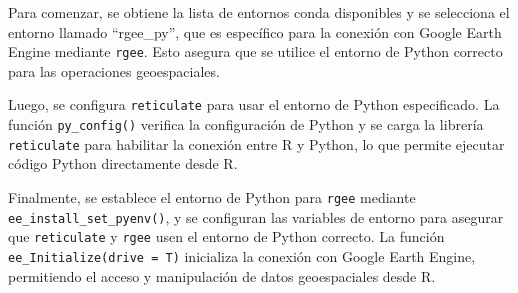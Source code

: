 \documentclass[
  12pt,
]{book}
\newenvironment{Shaded}{\begin{snugshade}}{\end{snugshade}}
\newcommand{\AttributeTok}[1]{\textcolor[rgb]{0.13,0.29,0.53}{#1}}
\newcommand{\CommentTok}[1]{\textcolor[rgb]{0.56,0.35,0.01}{\textit{#1}}}
\newcommand{\DecValTok}[1]{\textcolor[rgb]{0.00,0.00,0.81}{#1}}
\newcommand{\FunctionTok}[1]{\textcolor[rgb]{0.13,0.29,0.53}{\textbf{#1}}}
\newcommand{\NormalTok}[1]{#1}
\newcommand{\OtherTok}[1]{\textcolor[rgb]{0.56,0.35,0.01}{#1}}
\newcommand{\SpecialCharTok}[1]{\textcolor[rgb]{0.81,0.36,0.00}{\textbf{#1}}}
\newcommand{\StringTok}[1]{\textcolor[rgb]{0.31,0.60,0.02}{#1}}
\begin{document}
Para comenzar, se obtiene la lista de entornos conda disponibles y se selecciona el entorno llamado ``rgee\_py'', que es específico para la conexión con Google Earth Engine mediante \texttt{rgee}. Esto asegura que se utilice el entorno de Python correcto para las operaciones geoespaciales.

Luego, se configura \texttt{reticulate} para usar el entorno de Python especificado. La función \texttt{py\_config()} verifica la configuración de Python y se carga la librería \texttt{reticulate} para habilitar la conexión entre R y Python, lo que permite ejecutar código Python directamente desde R.

Finalmente, se establece el entorno de Python para \texttt{rgee} mediante \texttt{ee\_install\_set\_pyenv()}, y se configuran las variables de entorno para asegurar que \texttt{reticulate} y \texttt{rgee} usen el entorno de Python correcto. La función \texttt{ee\_Initialize(drive\ =\ T)} inicializa la conexión con Google Earth Engine, permitiendo el acceso y manipulación de datos geoespaciales desde R.

\begin{Shaded}
\end{Shaded}
\end{document}
